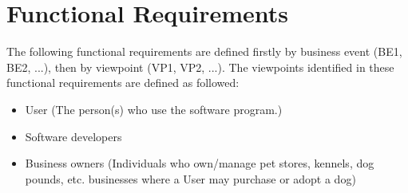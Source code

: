 \documentclass[]{article}
\begin{document}


\section{Functional Requirements}
\label{sec:functional_requirements}
The following functional requirements are defined firstly by business event (BE1, BE2, ...), then by viewpoint (VP1, VP2, ...). The viewpoints identified in these functional requirements are defined as followed:
\begin{itemize}
	\item User (The person(s) who use the software program.)
	\item Software developers 
	\item Business owners (Individuals who own/manage pet stores, kennels, dog pounds, etc. businesses where a User may purchase or adopt a dog)
\end{itemize}
\end{document}
